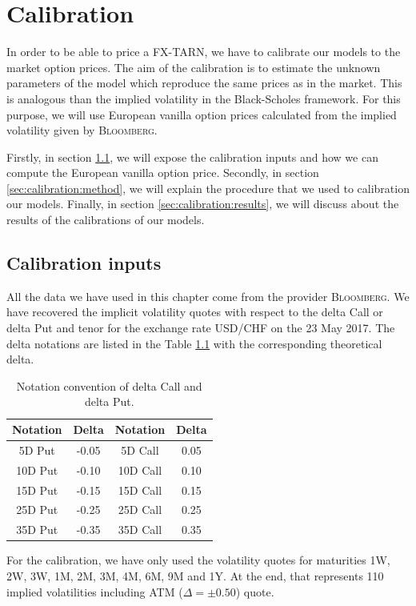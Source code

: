 \chapter{Calibration}
\label{sec:calibration}


In order to be able to price a FX-TARN, we have to calibrate our models to the market option prices. The aim of the calibration is to estimate the unknown parameters of the model which reproduce the same prices as in the market. This is analogous than the implied volatility in the Black-Scholes framework. For this purpose, we will use European vanilla option prices calculated from the implied volatility given by \textsc{Bloomberg}.

Firstly, in section \ref{sec:calibration:inputs}, we will expose the calibration inputs and how we can compute the European vanilla option price. Secondly, in section \ref{sec:calibration:method}, we will explain the procedure that we used to calibration our models. Finally, in section \ref{sec:calibration:results}, we will discuss about the results of the calibrations of our models.

\section{Calibration inputs}
\label{sec:calibration:inputs}
All the data we have used in this chapter come from the provider \textsc{Bloomberg}. We have recovered the implicit volatility quotes with respect to the delta Call or delta Put and tenor for the exchange rate USD/CHF on the 23 May 2017. The delta notations are listed in the Table \ref{tab:delta} with the corresponding theoretical delta. 

\begin{table}[!ht]
\centering
  \begin{tabular}{c|c||c|c}
   \toprule
   Notation & Delta & Notation & Delta\\
   \toprule
   5D Put & -0.05  & 5D Call  & 0.05\\ 
   10D Put & -0.10 & 10D Call & 0.10\\
   15D Put & -0.15 & 15D Call & 0.15\\
   25D Put & -0.25 & 25D Call & 0.25\\
   35D Put & -0.35 & 35D Call & 0.35\\
   \bottomrule
  \end{tabular}
  \vspace{5pt}
  \caption{\label{tab:delta} Notation convention of delta Call and delta Put.}
\end{table}
For the calibration, we have only used the volatility quotes for maturities 1W, 2W, 3W, 1M, 2M, 3M, 4M, 6M, 9M and 1Y. At the end, that represents 110 implied volatilities including ATM ($\Delta = \pm 0.50$) quote.

